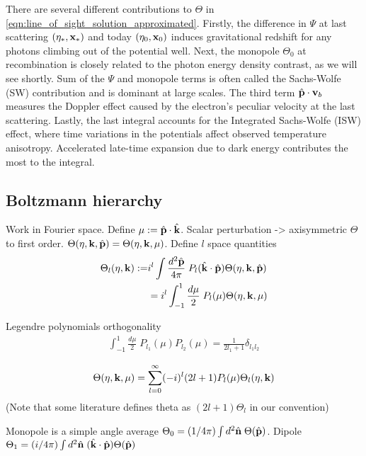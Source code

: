 There are several different contributions to $\Theta$ in \eqref{eqn:line_of_sight_solution_approximated}. Firstly, the difference in $\Psi$ at last scattering $(\eta_*,\mathbf{x}_*)$ and today $(\eta_0, \mathbf{x}_0)$ induces gravitational redshift for any photons climbing out of the potential well. Next, the monopole $\Theta_0$ at recombination is closely related to the photon energy density contrast, as we will see shortly. Sum of the $\Psi$ and monopole terms is often called the Sachs-Wolfe (SW) contribution and is dominant at large scales. The third term $\hat{\mathbf{p}}\cdot\mathbf{v}_b$ measures the Doppler effect caused by the electron's peculiar velocity at the last scattering. Lastly, the last integral accounts for the Integrated Sachs-Wolfe (ISW) effect, where time variations in the potentials affect observed temperature anisotropy. Accelerated late-time expansion due to dark energy contributes the most to the integral.


\subsection{Boltzmann hierarchy} \label{section:boltzmann_hierarchy}

Work in Fourier space. Define $\mu := \hat{\mathbf{p}}\cdot\hat{\mathbf{k}}$. Scalar perturbation -> axisymmetric $\Theta$ to first order. $\Theta(\eta,\mathbf{k},\hat{\mathbf{p}}) = \Theta(\eta,\mathbf{k},\mu)$. Define $l$ space quantities
\begin{align}
	\Theta_l (\eta,\mathbf{k}) :=& i^l \int \frac{d^2 \hat{\mathbf{p}}}{4\pi} \; P_l (\hat{\mathbf{k}} \cdot \hat{\mathbf{p}}) \Theta(\eta, \mathbf{k}, \hat{\mathbf{p}}) \\
	&= i^l \int^1_{-1} \frac{d\mu}{2} \; P_l (\mu) \Theta(\eta, \mathbf{k}, \mu)
\end{align}

Legendre polynomials orthogonality
\begin{align}
	\int_{-1}^{1} \frac{d\mu}{2} \; P_{l_1}(\mu) P_{l_2}(\mu) = \frac{1}{2l_1 + 1} \delta_{l_1 l_2}
\end{align}

\begin{align}
	\Theta(\eta,\mathbf{k},\mu) = \sum_{l=0}^{\infty} (-i)^l (2l+1) P_l (\mu) \Theta_l (\eta, \mathbf{k})
\end{align}
(Note that some literature defines theta as $(2l+1)\Theta_l$ in our convention)

Monopole is a simple angle average $\Theta_0 = (1/4\pi) \int d^2\hat{\mathbf{n}} \; \Theta(\hat{\mathbf{p}})$. Dipole $\Theta_1 = (i/4\pi) \int d^2\hat{\mathbf{n}} \; (\hat{\mathbf{k}} \cdot \hat{\mathbf{p}}) \Theta(\hat{\mathbf{p}})$

